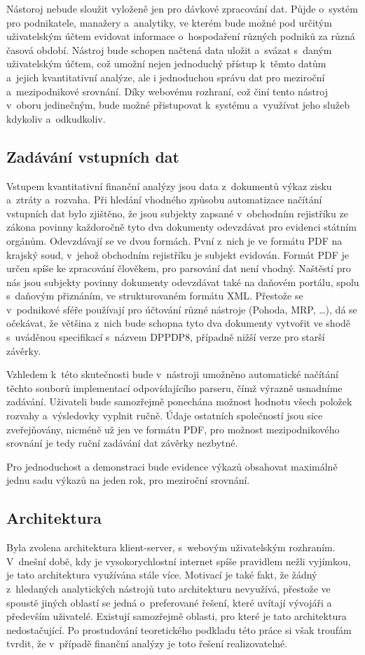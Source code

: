 Nástoroj nebude sloužit vyloženě jen pro dávkové zpracování dat. Půjde o~systém pro podnikatele, manažery a~analytiky, ve kterém bude možné pod určitým uživatelským účtem evidovat informace o~hospodaření různých podniků za různá časová období. Nástroj bude schopen načtená data uložit a~svázat s~daným uživatelským účtem, což umožní nejen jednoduchý přístup k~těmto datům a~jejich kvantitativní analýze, ale i jednoduchou správu dat pro meziroční a~mezipodnikové srovnání. Díky webovému rozhraní, což činí tento nástroj v~oboru jedinečným, bude možné přistupovat k~systému a~využívat jeho služeb kdykoliv a~odkudkoliv.

\subsection{Zadávání vstupních dat}
Vstupem kvantitativní finanční analýzy jsou data z~dokumentů výkaz zisku a~ztráty a~rozvaha. Při hledání vhodného způsobu automatizace načítání vstupních dat bylo zjištěno, že jsou subjekty zapsané v~obchodním rejistříku ze zákona povinny každoročně tyto dva dokumenty odevzdávat pro evidenci státním orgánům. 
Odevzdávají se ve dvou formách. Pvní z~nich je ve formátu PDF na krajský soud, v~jehož obchodním rejistříku je subjekt evidován. Formát PDF je určen spíše ke zpracování člověkem, pro parsování dat není vhodný. Naštěstí pro nás jsou subjekty povinny dokumenty odevzdávat také na daňovém portálu, spolu s~daňovým přiznáním, ve strukturovaném formátu XML. Přestože se v~podnikové sféře používají pro účtování různé nástroje (Pohoda, MRP, \dots), dá se očekávat, že většina z~nich bude schopna tyto dva dokumenty vytvořit ve shodě s~uváděnou specifikací s~názvem DPPDP8, případně nižší verze pro starší závěrky.

Vzhledem k~této skutečnosti bude v~nástroji umožněno automatické načítání těchto souborů implementací odpovídajícího parseru, čímž výrazně usnadníme zadávání. Uživateli bude samozřejmě ponechána možnost hodnotu všech položek rozvahy a~výsledovky vyplnit ručně. Údaje ostatních společností jsou sice zveřejňovány, nicméně už jen ve formátu PDF, pro možnost mezipodnikového srovnání je tedy ruční zadávání dat závěrky nezbytné.

Pro jednoduchost a demonstraci bude evidence výkazů obsahovat maximálně jednu sadu výkazů na jeden rok, pro meziroční srovnání.



\subsection{Architektura}
Byla zvolena architektura klient-server, s~webovým uživatelským rozhraním. V~dnešní době, kdy je vysokorychlostní internet spíše pravidlem nežli vyjímkou, je tato architektura využívána stále více. Motivací je také fakt, že žádný z~hledaných analytických nástrojů tuto architekturu nevyužívá, přestože ve spoustě jiných oblastí se jedná o~preferované řešení, které uvítají vývojáři a především uživatelé. Existují samozřejmě oblasti, pro které je tato architektura nedostačující. Po prostudování teoretického podkladu této práce si však troufám tvrdit, že v~případě finanční analýzy je toto řešení realizovatelné. 


